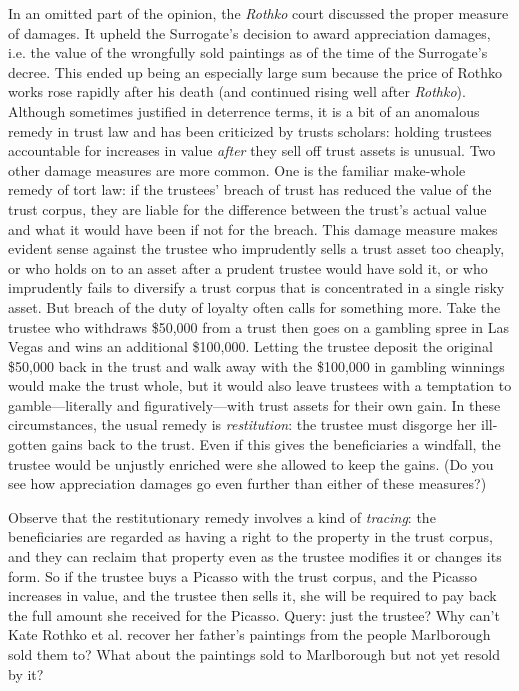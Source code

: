 \item In an omitted part of the opinion, the \textit{Rothko} court discussed the
proper measure of damages. It upheld the Surrogate's decision to award
appreciation damages, i.e. the value of the wrongfully sold paintings as of the
time of the Surrogate's decree. This ended up being an especially large sum
because the price of Rothko works rose rapidly after his death (and continued
rising well after \textit{Rothko}). Although sometimes justified in deterrence
terms, it is a bit of an anomalous remedy in trust law and has been criticized
by trusts scholars: holding trustees accountable for increases in value
\textit{after} they sell off trust assets is unusual. Two other damage measures
are more common. One is the familiar make-whole remedy of tort law: if the
trustees' breach of trust has reduced the value of the trust corpus, they are
liable for the difference between the trust's actual value and what it would
have been if not for the breach. This damage measure makes evident sense against
the trustee who imprudently sells a trust asset too cheaply, or who holds on to
an asset after a prudent trustee would have sold it, or who imprudently fails to
diversify a trust corpus that is concentrated in a single risky asset. But
breach of the duty of loyalty often calls for something more. Take the trustee
who withdraws \$50,000 from a trust then goes on a gambling spree in Las Vegas
and wins an additional \$100,000. Letting the trustee deposit the original
\$50,000 back in the trust and walk away with the \$100,000 in gambling winnings
would make the trust whole, but it would also leave trustees with a temptation
to gamble---literally and figuratively---with trust assets for their own
gain. In these circumstances, the usual remedy is \textit{restitution}: the
trustee must disgorge her ill-gotten gains back to the trust. Even if this gives
the beneficiaries a windfall, the trustee would be unjustly enriched were she
allowed to keep the gains. (Do you see how appreciation damages go even further
than either of these measures?) 


Observe that the restitutionary remedy involves a kind of \textit{tracing}: the
beneficiaries are regarded as having a right to the property in the trust
corpus, and they can reclaim that property even as the trustee modifies it or
changes its form. So if the trustee buys a Picasso with the trust corpus, and
the Picasso increases in value, and the trustee then sells it, she will be
required to pay back the full amount she received for the Picasso. Query: just
the trustee? Why can't Kate Rothko et al. recover her father's paintings from
the people Marlborough sold them to? What about the paintings sold to
Marlborough but not yet resold by it?


